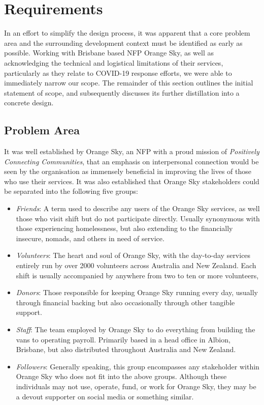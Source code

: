 \section{Requirements}

In an effort to simplify the design process, it was apparent that a core problem area and the surrounding development context must be identified as early as possible. Working with Brisbane based NFP Orange Sky, as well as acknowledging the technical and logistical limitations of their services, particularly as they relate to COVID-19 response efforts, we were able to immediately narrow our scope. The remainder of this section outlines the initial statement of scope, and subsequently discusses its further distillation into a concrete design.

\subsection{Problem Area}

It was well established by Orange Sky, an NFP with a proud mission of \emph{Positively Connecting Communities}, that an emphasis on interpersonal connection would be seen by the organisation as immensely beneficial in improving the lives of those who use their services. It was also established that Orange Sky stakeholders could be separated into the following five groups:

\begin{itemize}
    \item \emph{Friends}: A term used to describe any users of the Orange Sky services, as well those who visit shift but do not participate directly. Usually synonymous with those experiencing homelessness, but also extending to the financially insecure, nomads, and others in need of service.
    \item \emph{Volunteers}: The heart and soul of Orange Sky, with the day-to-day services entirely run by over 2000 volunteers across Australia and New Zealand. Each shift is usually accompanied by anywhere from two to ten or more volunteers,
    \item \emph{Donors}: Those responsible for keeping Orange Sky running every day, usually through financial backing but also occasionally through other tangible support.
    \item \emph{Staff}: The team employed by Orange Sky to do everything from building the vans to operating payroll. Primarily based in a head office in Albion, Brisbane, but also distributed throughout Australia and New Zealand.
    \item \emph{Followers}: Generally speaking, this group encompasses any stakeholder within Orange Sky who does not fit into the above groups. Although these individuals may not use, operate, fund, or work for Orange Sky, they may be a devout supporter on social media or something similar.
\end{itemize}

